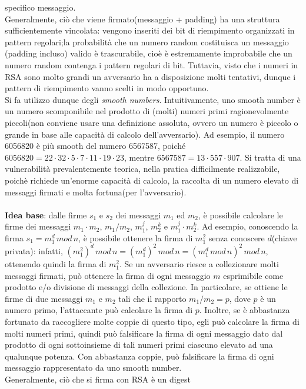 specifico messaggio. \\ Generalmente, ciò che viene firmato(messaggio + padding) ha una struttura sufficientemente vincolata: vengono inseriti dei bit di riempimento organizzati in pattern regolari;la probabilità che un numero random costituisca un messaggio (padding incluso) valido è trascurabile, cioè è estremamente improbabile che un numero random contenga i pattern regolari di bit. Tuttavia, visto che i numeri in RSA sono molto grandi un avversario ha a disposizione molti tentativi, dunque i pattern di riempimento vanno scelti in modo opportuno. \\ Si fa utilizzo dunque degli \textit{smooth numbers}. Intuitivamente, uno smooth number è un numero scomponibile nel prodotto di (molti) numeri primi ragionevolmente piccoli(non conviene usare una definizione assoluta, ovvero un numero è piccolo o grande in base alle capacità di calcolo dell'avversario). Ad esempio, il numero 6056820 è più smooth del numero 6567587, poiché $6056820 = 22 \cdot 32 \cdot 5 \cdot 7 \cdot 11 \cdot 19 \cdot 23$, mentre $ 6567587 = 13 \cdot 557 \cdot 907$. Si tratta di una vulnerabilità prevalentemente teorica, nella pratica difficilmente realizzabile, poichè richiede un'enorme capacità di calcolo, la raccolta di un numero elevato di messaggi firmati e molta fortuna(per l'avversario). \\ \\
\textbf{Idea base}: dalle firme $s_{1}$ e $s_{2}$ dei messaggi $m_{1}$ ed $m_{2}$, è possibile calcolare le firme dei messaggi $m_{1} \cdot m_{2}$, $m_{1}/m_{2}$, $m_{1}^j$, $m_{2}^k$ e $m_{1}^j \cdot m_{2}^k$. Ad esempio, conoscendo la firma $s_{1} = m_{1}^d \, mod \, n $, è possibile ottenere la firma di $m_{1}^2$ senza conoscere $d$(chiave privata): infatti, $(m_{1}^2)^d \, mod \, n = (m_{1}^d)^2 \, mod \, n = (m_{1}^d \, mod \, n)^2 \, mod \, n $, ottenendo quindi la firma di $m_{1}^2$. Se un avversario riesce a collezionare molti messaggi firmati, può ottenere la firma di ogni messaggio $m$ esprimibile come prodotto e/o divisione di messaggi della collezione. In particolare, se ottiene le firme di due messaggi $m_{1}$ e $m_{2}$ tali che il rapporto $m_{1}/m_{2}=p$, dove $p$ è un numero primo, l'attaccante può calcolare la firma di $p$. Inoltre, se è abbastanza fortunato da raccogliere molte coppie di questo tipo, egli può calcolare la firma di molti numeri primi, quindi può falsificare la firma di ogni messaggio dato dal prodotto di ogni sottoinsieme di tali numeri primi ciascuno elevato ad una qualunque potenza. Con abbastanza coppie, può falsificare la firma di ogni messaggio rappresentato da uno smooth number. \\ Generalmente, ciò che si firma con RSA è un digest
